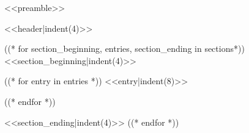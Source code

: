 <<preamble>>


    <<header|indent(4)>>

((* for section_beginning, entries, section_ending in sections*))
    <<section_beginning|indent(4)>>

    ((* for entry in entries *))
        <<entry|indent(8)>>

    ((* endfor *))

    <<section_ending|indent(4)>>
((* endfor *))

